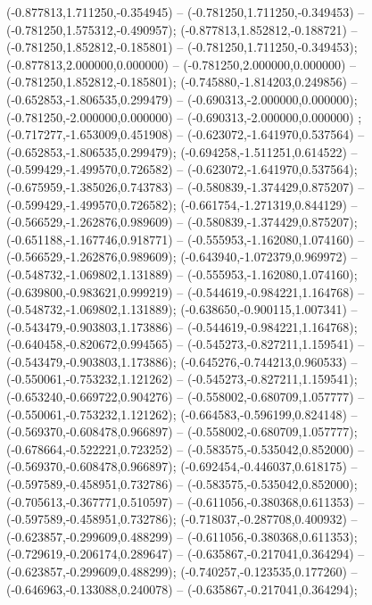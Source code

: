  (-0.877813,1.711250,-0.354945) -- (-0.781250,1.711250,-0.349453) -- (-0.781250,1.575312,-0.490957);
 (-0.877813,1.852812,-0.188721) -- (-0.781250,1.852812,-0.185801) -- (-0.781250,1.711250,-0.349453);
 (-0.877813,2.000000,0.000000) -- (-0.781250,2.000000,0.000000) -- (-0.781250,1.852812,-0.185801);
 (-0.745880,-1.814203,0.249856) -- (-0.652853,-1.806535,0.299479) -- (-0.690313,-2.000000,0.000000);
 (-0.781250,-2.000000,0.000000) -- (-0.690313,-2.000000,0.000000) ;
 (-0.717277,-1.653009,0.451908) -- (-0.623072,-1.641970,0.537564) -- (-0.652853,-1.806535,0.299479);
 (-0.694258,-1.511251,0.614522) -- (-0.599429,-1.499570,0.726582) -- (-0.623072,-1.641970,0.537564);
 (-0.675959,-1.385026,0.743783) -- (-0.580839,-1.374429,0.875207) -- (-0.599429,-1.499570,0.726582);
 (-0.661754,-1.271319,0.844129) -- (-0.566529,-1.262876,0.989609) -- (-0.580839,-1.374429,0.875207);
 (-0.651188,-1.167746,0.918771) -- (-0.555953,-1.162080,1.074160) -- (-0.566529,-1.262876,0.989609);
 (-0.643940,-1.072379,0.969972) -- (-0.548732,-1.069802,1.131889) -- (-0.555953,-1.162080,1.074160);
 (-0.639800,-0.983621,0.999219) -- (-0.544619,-0.984221,1.164768) -- (-0.548732,-1.069802,1.131889);
 (-0.638650,-0.900115,1.007341) -- (-0.543479,-0.903803,1.173886) -- (-0.544619,-0.984221,1.164768);
 (-0.640458,-0.820672,0.994565) -- (-0.545273,-0.827211,1.159541) -- (-0.543479,-0.903803,1.173886);
 (-0.645276,-0.744213,0.960533) -- (-0.550061,-0.753232,1.121262) -- (-0.545273,-0.827211,1.159541);
 (-0.653240,-0.669722,0.904276) -- (-0.558002,-0.680709,1.057777) -- (-0.550061,-0.753232,1.121262);
 (-0.664583,-0.596199,0.824148) -- (-0.569370,-0.608478,0.966897) -- (-0.558002,-0.680709,1.057777);
 (-0.678664,-0.522221,0.723252) -- (-0.583575,-0.535042,0.852000) -- (-0.569370,-0.608478,0.966897);
 (-0.692454,-0.446037,0.618175) -- (-0.597589,-0.458951,0.732786) -- (-0.583575,-0.535042,0.852000);
 (-0.705613,-0.367771,0.510597) -- (-0.611056,-0.380368,0.611353) -- (-0.597589,-0.458951,0.732786);
 (-0.718037,-0.287708,0.400932) -- (-0.623857,-0.299609,0.488299) -- (-0.611056,-0.380368,0.611353);
 (-0.729619,-0.206174,0.289647) -- (-0.635867,-0.217041,0.364294) -- (-0.623857,-0.299609,0.488299);
 (-0.740257,-0.123535,0.177260) -- (-0.646963,-0.133088,0.240078) -- (-0.635867,-0.217041,0.364294);
